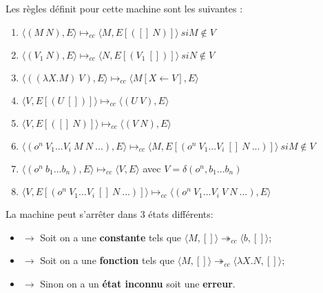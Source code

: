 \documentclass[10pt,a4paper]{report}
\begin{document}
Les règles définit pour cette machine sont les suivantes :
\begin{enumerate}
  
\item $\langle(M~N),E\rangle \longmapsto_{cc} \langle M,E[([]~N)]\rangle~si M \notin V$
  
\item $\langle(V_{1}~N),E\rangle \longmapsto_{cc}  \langle N,E[(V_{1}~[])]\rangle~si N \notin V$
  
\item $\langle((\lambda X.M)~V),E\rangle \longmapsto_{cc} \langle M[X\longleftarrow V],E\rangle$
  
\item $\langle V,E[(U~[])]\rangle \longmapsto_{cc} \langle(U~V),E\rangle$
  
\item $\langle V,E[([]~N)]\rangle \longmapsto_{cc} \langle(V~N),E\rangle$ 
  
\item $\langle(o^{n}~V_{1}...V_{i}~M~N~...),E\rangle \longmapsto_{cc}  
  \langle M,E[(o^{n}~V_{1}...V_{i}~[]~N~...)]\rangle~ si M \notin V$
  
\item $\langle(o^{n}~b_{1}...b_{n}),E\rangle \longmapsto_{cc}  \langle V,E\rangle$ avec $V = \delta(o^{n},b_{1}...b_{n})$ 
  
\item $\langle V,E[(o^{n}~V_{1}...V_{i}~[]~N~...)]\rangle \longmapsto_{cc} \langle(o^{n}~V_{1}...V_{i}~V~N ~...),E\rangle$ 
\end{enumerate}
\bigbreak


La machine peut s'arrêter dans 3 états différents:
\begin{itemize}
\item[]$\longrightarrow$ Soit on a une \textbf{constante} tels que $\langle M,[]\rangle \twoheadrightarrow_{cc} \langle b,[]\rangle$;
\item[]$\longrightarrow$ Soit on a une \textbf{fonction} tels que $\langle M,[]\rangle \twoheadrightarrow_{cc} \langle\lambda X.N,[]\rangle$;
\item[]$\longrightarrow$ Sinon on a un \textbf{état inconnu} soit une \textbf{erreur}.
\end{itemize}
\bigbreak
\end{document}
